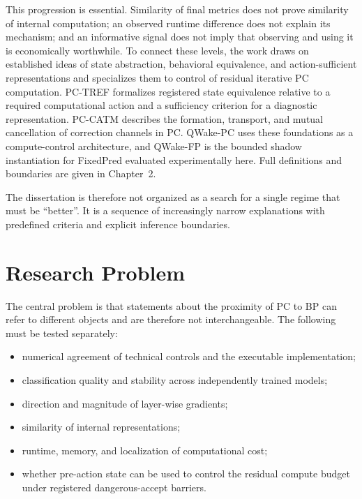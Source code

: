This progression is essential. Similarity of final metrics does not prove similarity
of internal computation; an observed runtime difference does not explain its
mechanism; and an informative signal does not imply that observing and using it is
economically worthwhile. To connect these levels, the work draws on established ideas
of state abstraction, behavioral equivalence, and action-sufficient representations
\cite{ferns2004metrics,li2006stateabstraction,huang2022actionsufficient,raman2026decisionrelevant}
and specializes them to control of residual iterative PC computation. PC-TREF
formalizes registered state equivalence relative to a required computational action
and a sufficiency criterion for a diagnostic representation. PC-CATM describes the
formation, transport, and mutual cancellation of correction channels in PC. QWake-PC
uses these foundations as a compute-control architecture, and QWake-FP is the bounded
shadow instantiation for FixedPred evaluated experimentally here. Full definitions and
boundaries are given in Chapter~2.

The dissertation is therefore not organized as a search for a single regime that
must be ``better''. It is a sequence of increasingly narrow explanations with
predefined criteria and explicit inference boundaries.

\section{Research Problem}

The central problem is that statements about the proximity of PC to BP can refer to
different objects and are therefore not interchangeable. The following must be tested
separately:
\begin{itemize}
  \item numerical agreement of technical controls and the executable implementation;
  \item classification quality and stability across independently trained models;
  \item direction and magnitude of layer-wise gradients;
  \item similarity of internal representations;
  \item runtime, memory, and localization of computational cost;
  \item whether pre-action state can be used to control the residual compute budget under registered dangerous-accept barriers.
\end{itemize}

